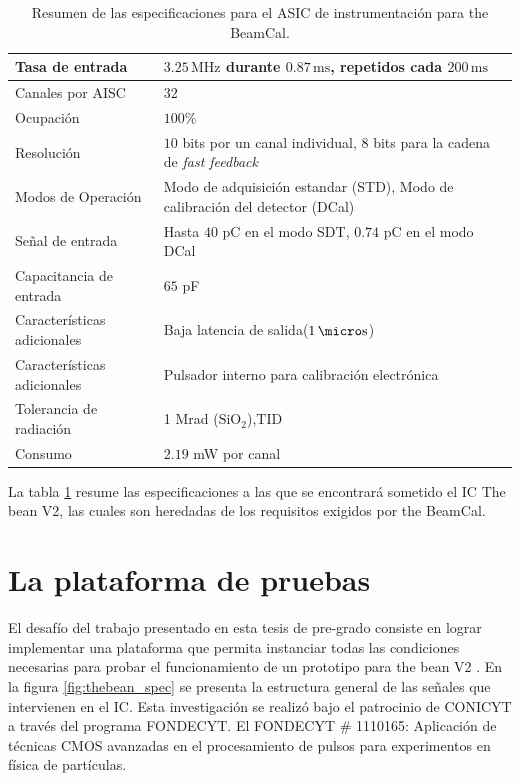 \begin{table}[!h]
	\begin{center}
		\begin{tabular}{|l|l|}\hline
			Tasa de entrada & $3.25\,\text{MHz}$ durante $0.87\,\text{ms}$, repetidos cada $200\,\text{ms}$ \\ \hline
			Canales por AISC & $32$ \\ \hline
			Ocupación & $100\%$ \\ \hline
			Resolución & $10$ bits por un canal individual, $8$ bits para la cadena de \textit{fast feedback} \\ \hline
			Modos de Operación & Modo de adquisición estandar (STD), Modo de calibración del detector (DCal) \\ \hline
			Señal de entrada & Hasta $40$ pC en el modo SDT, $0.74$ pC en el modo DCal \\ \hline
			Capacitancia de entrada & $65$ pF \\ \hline
			Características adicionales  & Baja latencia de salida($1\,\micro\text{s}$)\\ \hline
			Características adicionales  & Pulsador interno para calibración electrónica\\ \hline
			Tolerancia de radiación & 1 Mrad ($\text{SiO}_2$),TID \\ \hline
			Consumo & $2.19$ mW  por canal \\ \hline
			\end{tabular}
		\vspace*{5pt}
		\caption{Resumen de las especificaciones para el ASIC de instrumentación para the BeamCal.}\label{tab:bean_specs}
	\end{center}
\end{table}

 La tabla \ref{tab:bean_specs} resume las especificaciones a las que se encontrará sometido el IC The bean V2, las cuales son heredadas de los requisitos exigidos por the BeamCal.
 
\section{La plataforma de pruebas}
	El desafío del trabajo presentado en esta tesis de pre-grado consiste en lograr implementar una plataforma que permita instanciar todas las condiciones necesarias para probar el funcionamiento de un  prototipo para the bean V2 \citep{diegothesis}. En la figura \ref{fig:thebean_spec} se presenta la estructura general de las señales que intervienen en el IC. Esta investigación se realizó bajo el patrocinio de CONICYT a través del programa FONDECYT.
El FONDECYT  \# 1110165: Aplicación de técnicas CMOS avanzadas en el procesamiento de pulsos para experimentos en física de partículas.

